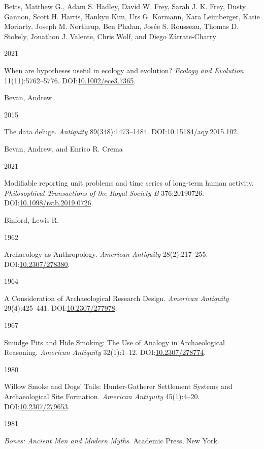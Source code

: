 \documentclass[
  12pt,
  a4paper,
  oneside]{book}
\newlength{\cslhangindent}
\newlength{\csllabelwidth}
\newlength{\cslentryspacingunit} %
\newenvironment{CSLReferences}[2] %
 {%
  \setlength{\parindent}{0pt}
  \ifodd #1
  \let\oldpar\par
  \def\par{\hangindent=\cslhangindent\oldpar}
  \fi
  \setlength{\parskip}{#2\cslentryspacingunit}
 }%
 {}
\newcommand{\CSLBlock}[1]{#1\hfill\break}
\newcommand{\CSLLeftMargin}[1]{\parbox[t]{\csllabelwidth}{#1}}
\newcommand{\CSLRightInline}[1]{\parbox[t]{\linewidth - \csllabelwidth}{#1}\break}
\begin{document}
\begin{CSLReferences}{0}{0}
\leavevmode{}%
\CSLBlock{Betts, Matthew G., Adam S. Hadley, David W. Frey, Sarah J. K. Frey, Dusty Gannon, Scott H. Harris, Hankyu Kim, Urs G. Kormann, Kara Leimberger, Katie Moriarty, Joseph M. Northrup, Ben Phalan, Josée S. Rousseau, Thomas D. Stokely, Jonathon J. Valente, Chris Wolf, and Diego Zárrate-Charry}
\CSLLeftMargin{ 2021}%
\CSLRightInline{{When are hypotheses useful in ecology and evolution?} \emph{Ecology and Evolution} 11(11):5762--5776. DOI:\href{https://doi.org/10.1002/ece3.7365}{10.1002/ece3.7365}.}

\leavevmode{}%
\CSLBlock{Bevan, Andrew}
\CSLLeftMargin{ 2015}%
\CSLRightInline{The data deluge. \emph{Antiquity} 89(348):1473--1484. DOI:\href{https://doi.org/10.15184/aqy.2015.102}{10.15184/aqy.2015.102}.}

\leavevmode{}%
\CSLBlock{Bevan, Andrew, and Enrico R. Crema}
\CSLLeftMargin{ 2021}%
\CSLRightInline{Modifiable reporting unit problems and time series of long-term human activity. \emph{Philosophical Transactions of the Royal Society B} 376:20190726. DOI:\href{https://doi.org/10.1098/rstb.2019.0726}{10.1098/rstb.2019.0726}.}

\leavevmode{}%
\CSLBlock{Binford, Lewis R.}
\CSLLeftMargin{ 1962}%
\CSLRightInline{Archaeology as Anthropology. \emph{American Antiquity} 28(2):217--255. DOI:\href{https://doi.org/10.2307/278380}{10.2307/278380}.}

\leavevmode{}%
\CSLLeftMargin{ 1964 }%
\CSLRightInline{{A Consideration of Archaeological Research Design}. \emph{American Antiquity} 29(4):425--441. DOI:\href{https://doi.org/10.2307/277978}{10.2307/277978}.}

\leavevmode{}%
\CSLLeftMargin{ 1967 }%
\CSLRightInline{{Smudge Pits and Hide Smoking: The Use of Analogy in Archaeological Reasoning}. \emph{American Antiquity} 32(1):1--12. DOI:\href{https://doi.org/10.2307/278774}{10.2307/278774}.}

\leavevmode{}%
\CSLLeftMargin{ 1980 }%
\CSLRightInline{{Willow Smoke and Dogs' Tails: Hunter-Gatherer Settlement Systems and Archaeological Site Formation}. \emph{American Antiquity} 45(1):4--20. DOI:\href{https://doi.org/10.2307/279653}{10.2307/279653}.}

\leavevmode{}%
\CSLLeftMargin{ 1981 }%
\CSLRightInline{\emph{{Bones: Ancient Men and Modern Myths}}. Academic Press, New York.}


\end{CSLReferences}
\end{document}
